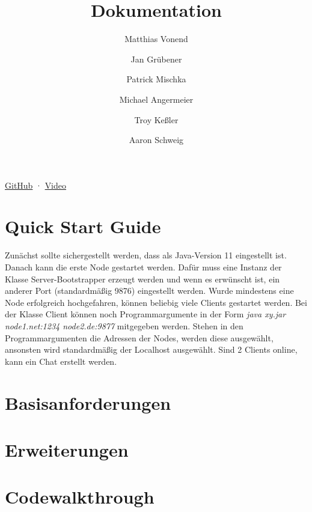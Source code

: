 \documentclass[a4paper]{article}
\title{Dokumentation}
\author{
    Matthias Vonend
    \and
    Jan Grübener
    \and
    Patrick Mischka
    \and
    Michael Angermeier
    \and
    Troy Keßler
    \and
    Aaron Schweig
}
\theoremstyle{definition}
\begin{document}
    \maketitle

    \begin{center}
      \href{https://github.com/aaronschweig/vs-chat/}{GitHub}
      ·
      \href{https://youtu.be/ZKApXYr4j58}{Video}
    \end{center}

    \tableofcontents
    \clearpage

    \author{}
    \section{Quick Start Guide}
    Zunächst sollte sichergestellt werden, dass als Java-Version 11 eingestellt ist.
    Danach kann die erste Node gestartet werden. Dafür muss eine Instanz der Klasse Server-Bootstrapper erzeugt werden
    und wenn es erwünscht ist, ein anderer Port (standardmäßig 9876) eingestellt werden.
    Wurde mindestens eine Node erfolgreich hochgefahren, können beliebig viele Clients gestartet werden. Bei der Klasse Client
    können noch Programmargumente in der Form \textit{java xy.jar node1.net:1234 node2.de:9877} mitgegeben werden. Stehen in den Programmargumenten die Adressen der Nodes, werden
    diese ausgewählt, ansonsten wird standardmäßig der Localhost ausgewählt.
    Sind 2 Clients online, kann ein Chat erstellt werden.
    \author{}
    \section{Basisanforderungen}
        
    \author{}
    \section{Erweiterungen}
        
    \clearpage
    \author{}
    \section{Codewalkthrough}
        
    
\end{document}
